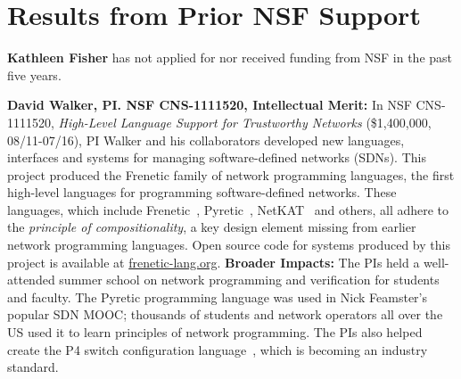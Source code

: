 \section{Results from Prior NSF Support}
\label{sec:prior-support}

\noindent
{\bf Kathleen Fisher} has not applied for nor received funding from NSF in the past
five years.

\medskip

\noindent
{\bf David Walker, PI. NSF CNS-1111520, Intellectual Merit:}
In NSF CNS-1111520, \emph{High-Level Language Support for Trustworthy Networks}
(\$1,400,000, 08/11-07/16),
PI Walker and his collaborators developed new languages, interfaces
and systems for managing software-defined networks (SDNs).
This project produced the Frenetic family
of network programming languages, the first high-level languages for
programming software-defined networks.  These languages, which include
Frenetic~\cite{frenetic},
Pyretic~\cite{pyretic},
NetKAT~\cite{netkat} and others, all adhere to the
\emph{principle of compositionality}, a key design element missing
from earlier network programming languages.
Open source code for systems produced by this project is available
at \url{frenetic-lang.org}.
%
{\bf Broader Impacts:}
The PIs held a well-attended summer school on network programming and
verification for students and faculty. The
Pyretic programming language was used in Nick Feamster's popular
SDN MOOC; thousands of students and
network operators all over the US used it to learn principles of network
programming.  The PIs
also helped create the P4 switch configuration language~\cite{P4}, which is
becoming an industry standard.

